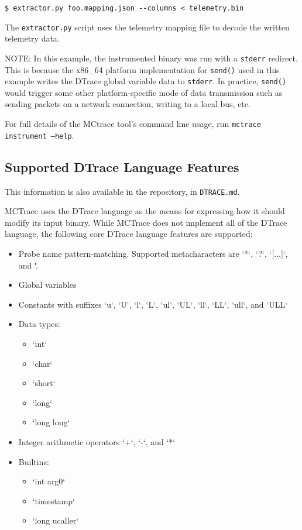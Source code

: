 \begin{verbatim}
$ extractor.py foo.mapping.json --columns < telemetry.bin
\end{verbatim}

The \texttt{extractor.py} script uses the telemetry mapping file to decode the
written telemetry data.

NOTE: In this example, the instrumented binary was run with a \texttt{stderr}
redirect. This is because the x86\_64 platform implementation for
\texttt{send()} used in this example writes the DTrace global variable
data to \texttt{stderr}. In practice, \texttt{send()} would trigger some other
platform-specific mode of data transmission such as sending packets on a
network connection, writing to a local bus, etc.

For full details of the MCtrace tool's command line usage, run
\texttt{mctrace instrument --help}.

\subsection{Supported DTrace Language Features}
\label{sec:supp-dtrace-lang}

This information is also available in the repository, in \texttt{DTRACE.md}.

MCTrace uses the DTrace language as the means for expressing how it
should modify its input binary. While MCTrace does not implement all of
the DTrace language, the following core DTrace language features are
supported:
\begin{itemize}
\item Probe name pattern-matching. Supported metacharacters are `*`, `?`,
  `[...]`, and `\`.
\item Global variables
\item Constants with suffixes `u`, `U`, `l`, `L`, `ul`, `UL`, `ll`, `LL`,
  `ull`, and `ULL`
\item Data types:
  \begin{itemize}
  \item`int`
  \item  `char`
  \item  `short`
  \item  `long`
  \item `long long`
  \end{itemize}
\item  Integer arithmetic operators `+`, `-`, and `*` 
\item Builtins:
  \begin{itemize}
\item `int arg0`
\item `timestamp`
\item `long ucaller`
\end{itemize}
\end{itemize}


